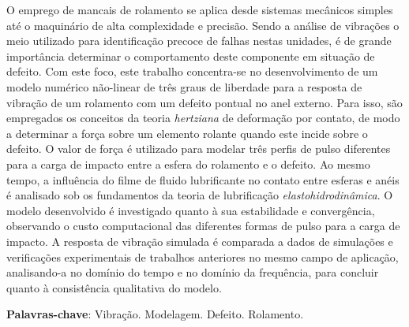 \imprimircapa
\imprimirfolhaderosto
\clearpage


\begin{agradecimentos}
%	
%	
\end{agradecimentos}

\begin{resumo}
	\SingleSpacing
	O emprego de mancais de rolamento se aplica desde sistemas mecânicos simples até o maquinário de alta complexidade e precisão.
	Sendo a análise de vibrações o meio utilizado para identificação precoce de falhas nestas unidades, é de grande importância determinar o comportamento deste componente em situação de defeito.
	Com este foco, este trabalho concentra-se no desenvolvimento de um modelo numérico não-linear de três graus de liberdade para a resposta de vibração de um rolamento com um defeito pontual no anel externo.
	Para isso, são empregados os conceitos da teoria \emph{hertziana} de deformação por contato, de modo a determinar a força sobre um elemento rolante quando este incide sobre o defeito.
	O valor de força é utilizado para modelar três perfis de pulso diferentes para a carga de impacto entre a esfera do rolamento e o defeito.
	Ao mesmo tempo, a influência do filme de fluido lubrificante no contato entre esferas e anéis é analisado sob os fundamentos da teoria de lubrificação \emph{elastohidrodinâmica}.
	O modelo desenvolvido é investigado quanto à sua estabilidade e convergência, observando o custo computacional das diferentes formas de pulso para a carga de impacto.
	A resposta de vibração simulada é comparada a dados de simulações e verificações experimentais de trabalhos anteriores no mesmo campo de aplicação, analisando-a no domínio do tempo e no domínio da frequência, para concluir quanto à consistência qualitativa do modelo.
	\vspace{\onelineskip}
	
	\noindent
	\textbf{Palavras-chave}: Vibração. Modelagem. Defeito. Rolamento.
\end{resumo}


